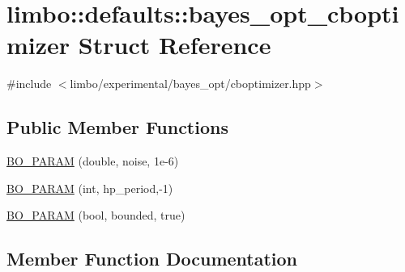 \hypertarget{structlimbo_1_1defaults_1_1bayes__opt__cboptimizer}{}\section{limbo\+:\+:defaults\+:\+:bayes\+\_\+opt\+\_\+cboptimizer Struct Reference}
\label{structlimbo_1_1defaults_1_1bayes__opt__cboptimizer}


{\ttfamily \#include $<$limbo/experimental/bayes\+\_\+opt/cboptimizer.\+hpp$>$}

\subsection*{Public Member Functions}
\begin{DoxyCompactItemize}
\item 
\hyperlink{structlimbo_1_1defaults_1_1bayes__opt__cboptimizer_a67222ae866c135cc8246bbcae0977fd7}{B\+O\+\_\+\+P\+A\+R\+A\+M} (double, noise, 1e-\/6)
\item 
\hyperlink{structlimbo_1_1defaults_1_1bayes__opt__cboptimizer_aba51e361b3c731a9e98bdea8907c0668}{B\+O\+\_\+\+P\+A\+R\+A\+M} (int, hp\+\_\+period,-\/1)
\item 
\hyperlink{structlimbo_1_1defaults_1_1bayes__opt__cboptimizer_ab416ec0728f1c4d825200dde1908bcd2}{B\+O\+\_\+\+P\+A\+R\+A\+M} (bool, bounded, true)
\end{DoxyCompactItemize}


\subsection{Member Function Documentation}
\hypertarget{structlimbo_1_1defaults_1_1bayes__opt__cboptimizer_a67222ae866c135cc8246bbcae0977fd7}{}

